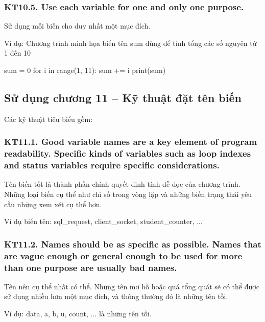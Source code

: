 \documentclass[12pt]{report}
\begin{document}
\subsubsection{KT10.5. Use each variable for one and only one purpose.}
Sử dụng mỗi biến cho duy nhất một mục đích. 

\noindent Ví dụ: Chương trình minh họa biến tên sum dùng để tính tổng các số nguyên từ 1 đến 10
\begin{python}
sum = 0
for i in range(1, 11):
	sum += i
print(sum) 
\end{python}

\subsection{Sử dụng chương 11 -- Kỹ thuật đặt tên biến}
\noindent Các kỹ thuật tiêu biểu gồm:

\subsubsection{KT11.1. Good variable names are a key element of program readability. Specific kinds of variables such as loop indexes and status variables require specific considerations.}
Tên biến tốt là thành phần chính quyết định tính dễ đọc của chương trình. Những loại biến cụ thể như chỉ số trong vòng lặp và những biến trạng thái yêu cầu những xem xét cụ thể hơn. 
\vspace*{3mm}

Ví dụ biến tên:  sql\_request, client\_socket, student\_counter, ... 

\subsubsection{KT11.2. Names should be as specific as possible. Names that are vague enough or general enough to be used for more than one purpose are usually bad names.}
Tên nên cụ thể nhất có thể. Những tên mơ hồ hoặc quá tổng quát sẽ có thể được sử dụng nhiều hơn một mục đích, và thông thường đó là những tên tồi. 
\vspace*{3mm}

Ví dụ: data, a, b, u, count, ... là những tên tồi.
\end{document}
